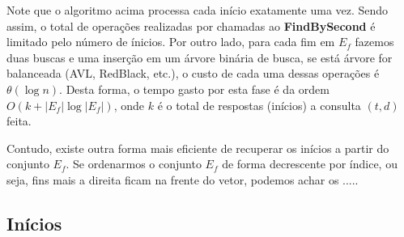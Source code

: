 \documentclass[12pt]{article}
\begin{document}
Note que o algoritmo acima processa cada início exatamente uma vez.
Sendo assim, o total de operações realizadas por chamadas ao {\bf FindBySecond}
é limitado pelo número de ínicios. Por outro lado, para cada fim em $E_f$ fazemos
duas buscas e uma inserção em um árvore binária de busca, se está árvore for balanceada (AVL, RedBlack, etc.),
 o custo de cada uma dessas operações é $\theta(\log n)$. Desta forma, o tempo gasto por esta fase é da ordem $O(k + |E_f|\log |E_f|)$,
 onde $k$ é o total de respostas (inícios) a consulta $(t, d)$ feita.

Contudo, existe outra forma mais eficiente de recuperar os inícios a partir do conjunto
$E_f$. Se ordenarmos o conjunto $E_f$ de forma decrescente por índice, ou seja, fins mais a direita
ficam na frente do vetor, podemos achar os .....


\subsection{Inícios}



\appendix
\end{document}
